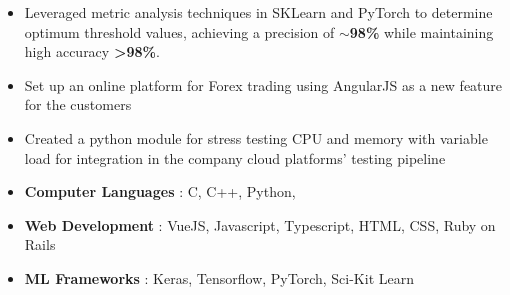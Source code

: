 \documentclass[10pt,a4paper,ragged2e,withhyper]{altacv}
\begin{document}
\begin{paracol}{2}
\begin{itemize}
   \item Leveraged metric analysis techniques in SKLearn and PyTorch to determine optimum threshold values, achieving a precision of \textbf{$\sim$98\%} while maintaining high accuracy \textbf{>98\%}.
\end{itemize}
\divider
{}
\begin{itemize}
\item Set up an online platform for Forex trading using AngularJS as a new feature for the customers
\item Created a python module for stress testing CPU and memory with variable load for integration in the company cloud platforms' testing pipeline
\end{itemize}

\begin{comment}
\cvsection{Technical Skills}
\cvskill{C/C++, Python, Java}{4}
\cvskill{Deep Learning}{4}
\cvskill{Computer Vision}{4}
\cvskill{Machine Learning}{3}
\cvskill{Databases}{3}
\cvskill{Robotics}{3}
\cvskill{Web Development}{2}
\end{comment}


\begin{itemize}
    \item \textbf{Computer Languages} : C, C++, Python, 
    \item \textbf{Web Development} : VueJS, Javascript, Typescript, HTML, CSS, Ruby on Rails
    \item \textbf{ML Frameworks} : Keras, Tensorflow, PyTorch, Sci-Kit Learn
\end{itemize}




\end{paracol}
\end{document}
